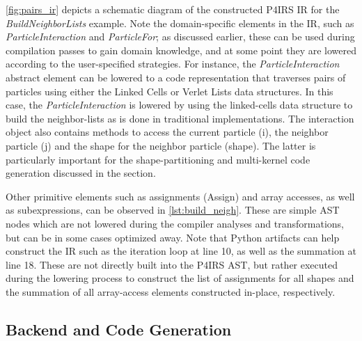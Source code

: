 \documentclass[Afour,sageh,times]{sagej}
\newcommand{\RMchange}[1]{{\color{blue} #1}}
\begin{document}
\autoref{fig:pairs_ir} depicts a schematic diagram of the constructed P4IRS \ac{IR} for the \emph{BuildNeighborLists} example.
\RMchange{Note the domain-specific elements in the IR, such as \emph{ParticleInteraction} and \emph{ParticleFor}; as discussed earlier, these can be used during compilation passes to gain domain knowledge, and at some point they are lowered according to the user-specified strategies.
For instance, the \emph{ParticleInteraction} abstract element can be lowered to a code representation that traverses pairs of particles using either the Linked Cells or Verlet Lists data structures.}
In this case, the \emph{ParticleInteraction} is lowered by using the linked-cells data structure to build the neighbor-lists as is done in traditional implementations.
The interaction object also contains methods to access the current particle (i), the neighbor particle (j) and the shape for the neighbor particle (shape).
The latter is particularly important for the shape-partitioning and multi-kernel code generation discussed in the  section.

Other primitive elements such as assignments (Assign) and array accesses, as well as subexpressions, can be observed in \autoref{lst:build_neigh}.
These are simple AST nodes which are not lowered during the compiler analyses and transformations, but can be in some cases optimized away.
Note that Python artifacts can help construct the IR such as the iteration loop at line 10, as well as the summation at line 18.
These are not directly built into the P4IRS AST, but rather executed during the lowering process to construct the list of assignments for all shapes and the summation of all array-access elements constructed in-place, respectively.

\subsection{Backend and Code Generation}
\label{sec:backend}
\end{document}
